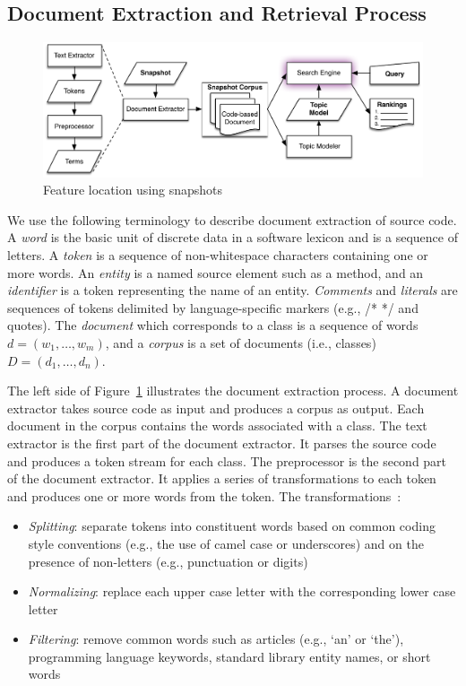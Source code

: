 


\subsection{Document Extraction and Retrieval Process}


\begin{figure}
\vspace{2mm}
\centerline{\includegraphics[width=.75\textwidth]{figures/snapshot-flt}}
\caption{Feature location using snapshots}
\label{fig:snapshot}
\vspace{-2mm}
\end{figure}

We use the following terminology to describe document extraction of source code.
A \textit{word} is the basic unit of discrete data in a software lexicon and is a sequence of letters.
A \textit{token} is a sequence of non-whitespace characters containing one or more words.
An \textit{entity} is a named source element such as a method,
and an \textit{identifier} is a token representing the name of an entity.
\textit{Comments} and \textit{literals} are sequences of tokens delimited by language-specific markers (e.g., /* */ and quotes).
The \textit{document} which corresponds to a class is a sequence of words $d = (w_1, \ldots, w_m)$,
and a \textit{corpus} is a set of documents (i.e., classes) $D = (d_1, \ldots, d_n)$.

The left side of Figure~\ref{fig:snapshot} illustrates the document extraction process.
A document extractor takes source code as input and produces a corpus as output.
Each document in the corpus contains the words associated with a class.
The text extractor is the first part of the document extractor.
It parses the source code and produces a token stream for each class.
The preprocessor is the second part of the document extractor.
It applies a series of transformations to each token and
produces one or more words from the token.
The transformations~\cite{Marcus-etal:2004,Marcus-Menzies:2010}: %
\begin{itemize}
    \item {\it Splitting}: separate tokens into constituent words
        based on common coding style conventions (e.g., the use of camel case or underscores)
        and on the presence of non-letters (e.g., punctuation or digits)
    \item {\it Normalizing}: replace each upper case letter with the corresponding
        lower case letter \item {\it Filtering}: remove common words such as
        articles (e.g., `an' or `the'),
        programming language keywords, standard library entity names, or short words
\end{itemize}

